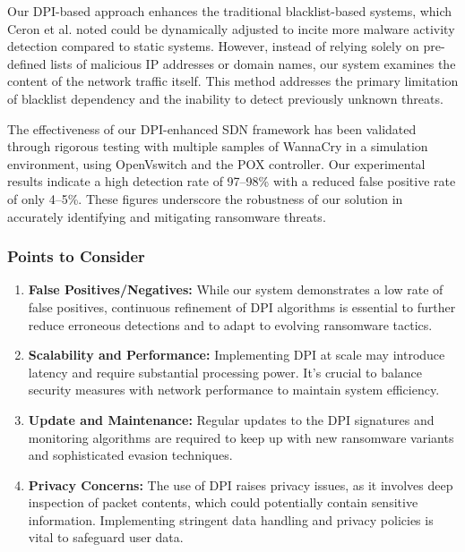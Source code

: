 \documentclass[12pt,letterpaper]{article}
\begin{document}
    Our DPI-based approach enhances the traditional blacklist-based systems, which Ceron et al. \cite{7543792} noted could be dynamically adjusted to incite more malware activity detection compared to static systems. However, instead of relying solely on pre-defined lists of malicious IP addresses or domain names, our system examines the content of the network traffic itself. This method addresses the primary limitation of blacklist dependency and the inability to detect previously unknown threats.

    The effectiveness of our DPI-enhanced SDN framework has been validated through rigorous testing with multiple samples of WannaCry in a simulation environment, using OpenVswitch and the POX controller. Our experimental results indicate a high detection rate of 97–98\% with a reduced false positive rate of only 4–5\%. These figures underscore the robustness of our solution in accurately identifying and mitigating ransomware threats.

    \subsubsection{Points to Consider}

    \begin{enumerate}
    
        \item \textbf{False Positives/Negatives:} While our system demonstrates a low rate of false positives, continuous refinement of DPI algorithms is essential to further reduce erroneous detections and to adapt to evolving ransomware tactics.

        \item \textbf{Scalability and Performance:} Implementing DPI at scale may introduce latency and require substantial processing power. It's crucial to balance security measures with network performance to maintain system efficiency.
        
        \item \textbf{Update and Maintenance:} Regular updates to the DPI signatures and monitoring algorithms are required to keep up with new ransomware variants and sophisticated evasion techniques.
        
        \item \textbf{Privacy Concerns:} The use of DPI raises privacy issues, as it involves deep inspection of packet contents, which could potentially contain sensitive information. Implementing stringent data handling and privacy policies is vital to safeguard user data.
    \end{enumerate}
\end{document}
